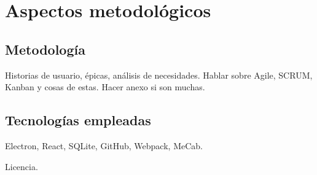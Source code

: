 \chapter{Aspectos metodológicos}  

\section{Metodología}

Historias de usuario, épicas, análisis de necesidades. Hablar sobre Agile, SCRUM, Kanban y cosas de estas.
Hacer anexo si son muchas.

\section{Tecnologías empleadas}

Electron, React, SQLite, GitHub, Webpack, MeCab.

Licencia.
